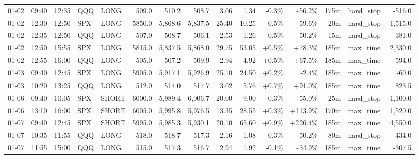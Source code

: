 \documentclass[11pt,a4paper,twoside]{article}
\begin{document}
\begin{landscape}
\begin{center}
\begin{longtable}{>{\color{txtmain}}l l l l l r r r r r r r r >{\color{txtmain}}l r}
01-02 & 09:40 & 12:35 & QQQ & LONG & 509.0 & 510.2 & 508.7 & 3.06 & 1.34 & \textcolor{lossred}{-0.3\%} & \textcolor{lossred}{-56.2\%} & 175m & hard\_stop & \textcolor{lossred}{-516.0} \\
01-02 & 12:30 & 12:50 & SPX & LONG & 5850.0 & 5,868.6 & 5,837.5 & 25.40 & 10.25 & \textcolor{lossred}{-0.5\%} & \textcolor{lossred}{-59.6\%} & 20m & hard\_stop & \textcolor{lossred}{-1,515.0} \\
01-02 & 12:35 & 12:50 & QQQ & LONG & 507.0 & 508.7 & 506.1 & 2.53 & 1.26 & \textcolor{lossred}{-0.5\%} & \textcolor{lossred}{-50.2\%} & 15m & hard\_stop & \textcolor{lossred}{-381.0} \\
01-02 & 12:50 & 15:55 & SPX & LONG & 5815.0 & 5,837.5 & 5,868.0 & 29.75 & 53.05 & \textcolor{wingreen}{+0.5\%} & \textcolor{wingreen}{+78.3\%} & 185m & max\_time & \textcolor{wingreen}{2,330.0} \\
01-02 & 12:55 & 16:00 & QQQ & LONG & 505.0 & 507.2 & 509.9 & 2.94 & 4.92 & \textcolor{wingreen}{+0.5\%} & \textcolor{wingreen}{+67.5\%} & 185m & max\_time & \textcolor{wingreen}{594.0} \\
01-03 & 09:40 & 12:45 & SPX & LONG & 5905.0 & 5,917.1 & 5,926.9 & 25.10 & 24.50 & \textcolor{wingreen}{+0.2\%} & \textcolor{lossred}{-2.4\%} & 185m & max\_time & \textcolor{lossred}{-60.0} \\
01-03 & 10:20 & 13:25 & QQQ & LONG & 512.0 & 514.0 & 517.7 & 3.02 & 5.76 & \textcolor{wingreen}{+0.7\%} & \textcolor{wingreen}{+91.0\%} & 185m & max\_time & \textcolor{wingreen}{823.5} \\
01-06 & 09:40 & 10:05 & SPX & SHORT & 6000.0 & 5,989.4 & 6,006.7 & 20.00 & 9.00 & \textcolor{lossred}{-0.3\%} & \textcolor{lossred}{-55.0\%} & 25m & hard\_stop & \textcolor{lossred}{-1,100.0} \\
01-06 & 13:10 & 16:00 & SPX & SHORT & 6005.0 & 5,995.8 & 5,976.5 & 13.35 & 28.55 & \textcolor{wingreen}{+0.3\%} & \textcolor{wingreen}{+113.9\%} & 170m & max\_time & \textcolor{wingreen}{1,520.0} \\
01-07 & 09:40 & 12:45 & SPX & SHORT & 5995.0 & 5,985.3 & 5,930.1 & 20.10 & 65.60 & \textcolor{wingreen}{+0.9\%} & \textcolor{wingreen}{+226.4\%} & 185m & max\_time & \textcolor{wingreen}{4,550.0} \\
01-07 & 10:35 & 11:55 & QQQ & LONG & 518.0 & 518.7 & 517.3 & 2.16 & 1.08 & \textcolor{lossred}{-0.3\%} & \textcolor{lossred}{-50.2\%} & 80m & hard\_stop & \textcolor{lossred}{-434.0} \\
01-07 & 11:55 & 15:00 & QQQ & LONG & 515.0 & 517.3 & 516.7 & 2.94 & 1.92 & \textcolor{lossred}{-0.1\%} & \textcolor{lossred}{-34.9\%} & 185m & max\_time & \textcolor{lossred}{-307.5} \\

\end{longtable}
\end{center}
\end{landscape}
\end{document}
